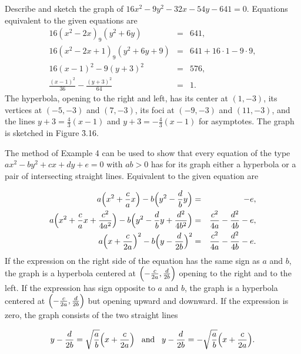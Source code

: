 \begin{example}
Describe and sketch the graph of $16x^2 - 9y^2 - 32x - 54y - 641 = 0$. Equations equivalent to the given equations are
\begin{eqnarray*}
                   16(x^2 - 2x) _ 9(y^2 + 6y) &=& 641, \\
       16(x^2 - 2x + 1) _ 9(y^2 + 6y + 9) &=& 641 + 16 \cdot 1 - 9 \cdot 9,\\
                      16(x - 1 )^2 - 9(y + 3)^2 &=& 576,\\
\frac{(x-1)^2}{36} - \frac{ (y+3)^2}{64} &=& 1.
\end{eqnarray*}
\noindent The hyperbola, opening to the right and left, has its center at $(1, - 3)$, its vertices at $(-5, -3)$ and $(7, -3)$, its foci at $(-9, -3)$ and $(11, -3)$, and the lines $y + 3 = \frac{4}{3}(x - 1)$ and $y + 3 = - \frac{4}{3}(x - 1)$ for asymptotes. The graph is sketched in Figure \f{3.16}.
\end{example}

The method of Example 4 can be used to show that every equation of the type $ax^2 - by^2 + cx + dy + e = 0$ with $ab > 0$ has for its graph either a hyperbola or a pair of intersecting straight lines. Equivalent to the given equation are

\begin{eqnarray*}
a \Bigl( x^2 + \frac{c}{a} x \Bigr) - b \Bigl( y^2 - \frac{d}{b} y \Bigr) &=& - e,\\
a \Bigl(x^2 + \frac{c}{a} x + \frac{c^2}{4a^2} \Bigr) - b \Bigl( y^2 - \frac{d}{b} y + \frac{d^2}{4b^2} \Bigr) &=&
\frac{c^2}{4a} - \frac{d^2}{4b} - e,\\ 
a \Bigl( x + \frac{c}{2a} \Bigr)^2 - b \Bigl( y - \frac{d}{2b} \Bigr)^2 &=& \frac{c^2}{4a} - \frac{d^2}{4b} - e. 
\end{eqnarray*}
\noindent If the expression on the right side of the equation has the
same sign as $a$ and $b$, the graph is a hyperbola centered at $\Bigl( -\frac{c}{2a}, \frac{d}{2b} \Bigr)$ opening to the right and to the left. If the expression has sign opposite to $a$ and $b$, the graph is a hyperbola centered at $\Bigl(-\frac{c}{2a}, \frac{d}{2b}\Bigr)$ but opening upward and downward. If the expression is zero, the graph consists of the two
straight lines

$$
y - \frac{d}{2b} = \sqrt{\frac{a}{b}} \Bigl(x + \frac{c}{2a} \Bigr) \;\;\; \mbox{and} \;\;\;
y - \frac{d}{2b} = - \sqrt{\frac{a}{b}} \Bigl(x + \frac{c}{2a} \Bigr).
$$

